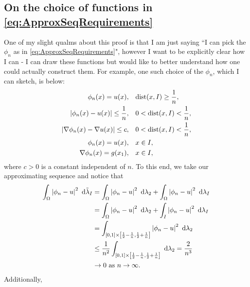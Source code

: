 \documentclass[11pt]{report}
\theoremstyle{plain}
\newcommand{\tlambda}{\tilde{\lambda}}
\begin{document}
\subsection*{On the choice of functions in \eqref{eq:ApproxSeqRequirements}}
	One of my slight qualms about this proof is that I am just saying ``I can pick the $\phi_n$ as in \eqref{eq:ApproxSeqRequirements}", however I want to be explicitly clear how I can - I can draw these functions but would like to better understand how one could actually construct them.	
	For example, one such choice of the $\phi_n$, which I can sketch, is below:
	\begin{subequations} \label{eq:SpecificReqs}
		\begin{align}
			\phi_n(x) = u(x), &\quad \mathrm{dist}(x,I)\geq\frac{1}{n}, \\
			\left\lvert \phi_n(x) - u(x) \right\rvert \leq \frac{1}{n}, &\quad 0<\mathrm{dist}(x,I)<\frac{1}{n}, \\
			\left\lvert \nabla\phi_n(x) - \nabla u(x) \right\rvert \leq c, &\quad 0<\mathrm{dist}(x,I)<\frac{1}{n}, \\
			\phi_n(x) = u(x), &\quad x\in I, \\
			\nabla\phi_n(x) = g(x_1), &\quad x\in I,
		\end{align}
	\end{subequations}
	where $c>0$ is a constant independent of $n$.
	To this end, we take our approximating sequence and notice that
	\begin{subequations}
		\begin{align}
			\integral{\ddom}{\abs{\phi_n - u}^2}{\tlambda_I}
			&= \integral{\ddom}{\abs{\phi_n - u}^2}{\lambda_2} + \integral{\ddom}{\abs{\phi_n - u}^2}{\lambda_I} \\
			&= \integral{\ddom}{\abs{\phi_n - u}^2}{\lambda_2} + \integral{I}{\abs{\phi_n - u}^2}{\lambda_I} \\
			&= \integral{\sqbracs{0,1}\times\sqbracs{\recip{2}-\recip{n},\recip{2}+\recip{n}}}{\abs{\phi_n - u}^2}{\lambda_2} \\
			&\leq \recip{n^2}\integral{\sqbracs{0,1}\times\sqbracs{\recip{2}-\recip{n},\recip{2}+\recip{n}}}{}{\lambda_2} = \frac{2}{n^3} \\
			&\rightarrow 0 \toInfty{n}.
		\end{align}
	\end{subequations}
	Additionally,
\end{document}
